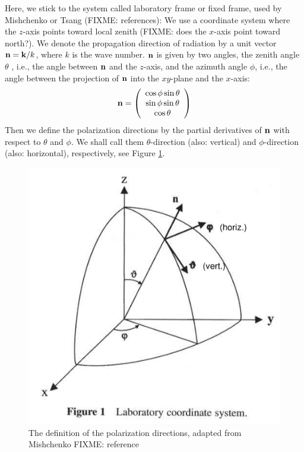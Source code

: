 Here, we stick to the system called laboratory frame or fixed frame,
used by Mishchenko or Tsang (FIXME: references): We use a coordinate
system where the $z$-axis points toward local zenith (FIXME: does the
$x$-axis point toward north?).  We denote the propagation direction of
radiation by a unit vector $\mathbf{n} = \mathbf{k}/k$, where
$k$ is the wave number. $\mathbf{n}$ is given by two
angles, the zenith angle $\theta$ , i.e., the angle between
$\mathbf{n}$ and the $z$-axis, and the azimuth angle $\phi$, i.e., the
angle between the projection of $\mathbf{n}$ into the $xy$-plane and
the $x$-axis:
\begin{equation}
  \label{eq:polarization:propdir}
   \VctStl{n} = \ColVct{\cos\phi \sin\theta}%
                       {\sin\phi \sin\theta}%
                       { \cos\theta}                    
\end{equation}
Then we define the polarization directions by the partial derivatives
of  $\mathbf{n}$ with respect to $\theta$ and $\phi$. We shall call
them $\theta$-direction (also: vertical) and $\phi$-direction (also:
horizontal), respectively, see
Figure \ref{fig:polarization:directions}. 
\begin{figure}
 \begin{center}
  \begin{minipage}[c]{0.9\textwidth}
   \begin{center}
    \includegraphics*[width=0.9\hsize]{pol_directions}
   \end{center}
  \end{minipage}
  \begin{minipage}[c]{0.9\textwidth}
   \caption{The definition of the polarization directions, adapted
     from Mishchenko FIXME: reference}
   \label{fig:polarization:directions}
  \end{minipage}
 \end{center}
\end{figure}   
